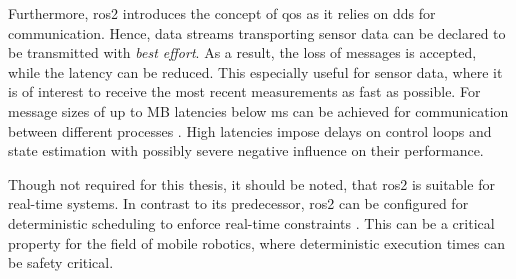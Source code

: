 Furthermore, \ac{ros2} introduces the concept of \ac{qos} as it relies on \ac{dds} for communication. Hence, data streams transporting sensor data can be declared to be transmitted with \emph{best effort}. As a result, the loss of messages is accepted, while the latency can be reduced. This especially useful for sensor data, where it is of interest to receive the most recent measurements as fast as possible. For message sizes of up to \unit[1]{MB} latencies below \unit[1]{ms} can be achieved for communication between different processes \cite{ros2}. High latencies impose delays on control loops and state estimation with possibly severe negative influence on their performance.

Though not required for this thesis, it should be noted, that \ac{ros2} is suitable for real-time systems. In contrast to its predecessor, \ac{ros2} can be configured for deterministic scheduling to enforce real-time constraints \cite{ros-realtime20}. This can be a critical property for the field of mobile robotics, where deterministic execution times can be safety critical.

